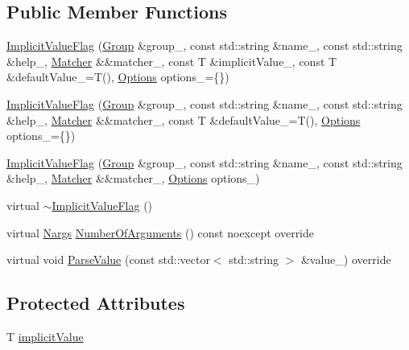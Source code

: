 \subsection*{Public Member Functions}
\begin{DoxyCompactItemize}
\item 
\hyperlink{classargs_1_1_implicit_value_flag_a666c1c0eca8615180da70ca76d446594}{Implicit\+Value\+Flag} (\hyperlink{classargs_1_1_group}{Group} \&group\+\_\+, const std\+::string \&name\+\_\+, const std\+::string \&help\+\_\+, \hyperlink{classargs_1_1_matcher}{Matcher} \&\&matcher\+\_\+, const T \&implicit\+Value\+\_\+, const T \&default\+Value\+\_\+=T(), \hyperlink{namespaceargs_aa530c0f95194aa275f49a5f299ac9e77}{Options} options\+\_\+=\{\})
\item 
\hyperlink{classargs_1_1_implicit_value_flag_aa2dd8fbab60032df5027d80962a5743d}{Implicit\+Value\+Flag} (\hyperlink{classargs_1_1_group}{Group} \&group\+\_\+, const std\+::string \&name\+\_\+, const std\+::string \&help\+\_\+, \hyperlink{classargs_1_1_matcher}{Matcher} \&\&matcher\+\_\+, const T \&default\+Value\+\_\+=T(), \hyperlink{namespaceargs_aa530c0f95194aa275f49a5f299ac9e77}{Options} options\+\_\+=\{\})
\item 
\hyperlink{classargs_1_1_implicit_value_flag_aa83bd9cd565c0e265e293c856ae0d119}{Implicit\+Value\+Flag} (\hyperlink{classargs_1_1_group}{Group} \&group\+\_\+, const std\+::string \&name\+\_\+, const std\+::string \&help\+\_\+, \hyperlink{classargs_1_1_matcher}{Matcher} \&\&matcher\+\_\+, \hyperlink{namespaceargs_aa530c0f95194aa275f49a5f299ac9e77}{Options} options\+\_\+)
\item 
virtual \hyperlink{classargs_1_1_implicit_value_flag_ac075d9514ac7d6907d2f26fd2fa078e2}{$\sim$\+Implicit\+Value\+Flag} ()
\item 
virtual \hyperlink{structargs_1_1_nargs}{Nargs} \hyperlink{classargs_1_1_implicit_value_flag_a7cfc67aca2b32921e722f51d349df2c5}{Number\+Of\+Arguments} () const noexcept override
\item 
virtual void \hyperlink{classargs_1_1_implicit_value_flag_a4c3124a516ca870903c4788dce781292}{Parse\+Value} (const std\+::vector$<$ std\+::string $>$ \&value\+\_\+) override
\end{DoxyCompactItemize}
\subsection*{Protected Attributes}
\begin{DoxyCompactItemize}
\item 
T \hyperlink{classargs_1_1_implicit_value_flag_a3cd2d0dac7fc96c4518608bb1525d934}{implicit\+Value}
\end{DoxyCompactItemize}
